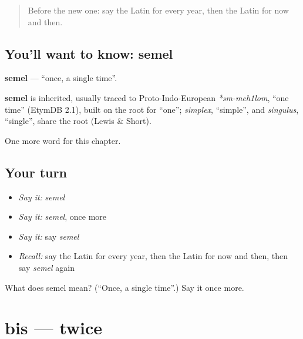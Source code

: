 \label{lesson:LA-C176-semel}



\begin{quote}
Before the new one: say the Latin for every year, then the Latin for now and then.
\end{quote}

\subsection*{You'll want to know: semel}
\textbf{semel} — \textquotedblleft{}once, a single time\textquotedblright{}.

\begin{cousinweb}
\textbf{semel} is inherited, usually traced to Proto-Indo-European \emph{*sm-meh1lom}, \textquotedblleft{}one time\textquotedblright{} (EtymDB 2.1), built on the root for \textquotedblleft{}one\textquotedblright{}; \emph{simplex}, \textquotedblleft{}simple\textquotedblright{}, and \emph{singulus}, \textquotedblleft{}single\textquotedblright{}, share the root (Lewis \& Short).
\end{cousinweb}

\begin{grammarlens}[title={What you've built}]
One more word for this chapter.
\end{grammarlens}

\subsection*{Your turn}
\begin{itemize}
\raggedright
  \item \emph{Say it:} \emph{semel}
  \item \emph{Say it:} \emph{semel}, once more
  \item \emph{Say it:} say \emph{semel}
  \item \emph{Recall:} say the Latin for every year, then the Latin for now and then, then say \emph{semel} again
\end{itemize}

\begin{tcolorbox}[breakable,colback=teal!4,colframe=teal!35!black,title={Before you move on}]
What does semel mean? (\textquotedblleft{}Once, a single time\textquotedblright{}.) Say it once more.
\end{tcolorbox}
\section[bis]{bis — twice}

